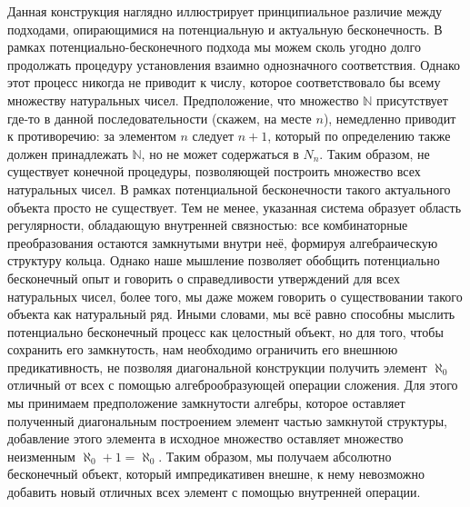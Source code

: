 \documentclass[12pt]{article}
\begin{document}
Данная конструкция наглядно иллюстрирует принципиальное различие между подходами, опирающимися на потенциальную и актуальную бесконечность. В рамках потенциально-бесконечного подхода мы можем сколь угодно долго продолжать процедуру установления взаимно однозначного соответствия. Однако этот процесс никогда не приводит к числу, которое соответствовало бы всему множеству натуральных чисел. Предположение, что множество $\mathbb{N}$ присутствует где-то в данной последовательности (скажем, на месте $n$), немедленно приводит к противоречию: за элементом $n$ следует $n + 1$, который по определению также должен принадлежать $\mathbb{N}$, но не может содержаться в $N_n$. Таким образом, не существует конечной процедуры, позволяющей построить множество всех натуральных чисел. В рамках потенциальной бесконечности такого актуального объекта просто не существует. Тем не менее, указанная система образует область регулярности, обладающую внутренней связностью: все комбинаторные преобразования остаются замкнутыми внутри неё, формируя алгебраическую структуру кольца. Однако наше мышление позволяет обобщить потенциально бесконечный опыт и говорить о справедливости утверждений для всех натуральных чисел, более того, мы даже можем говорить о существовании такого объекта как натуральный ряд. Иными словами, мы всё равно способны мыслить потенциально бесконечный процесс как целостный объект, но для того, чтобы сохранить его замкнутость, нам необходимо ограничить его внешнюю предикативность, не позволяя диагональной конструкции получить элемент $\aleph_0$ отличный от всех с помощью алгеброобразующей операции сложения. Для этого мы принимаем предположение замкнутости алгебры, которое оставляет полученный диагональным построением элемент частью замкнутой структуры, добавление этого элемента в исходное множество оставляет множество неизменным $\aleph_0 + 1 = \aleph_0$. Таким образом, мы получаем абсолютно бесконечный объект, который импредикативен внешне, к нему невозможно добавить новый отличных всех элемент с помощью внутренней операции.
\end{document}
